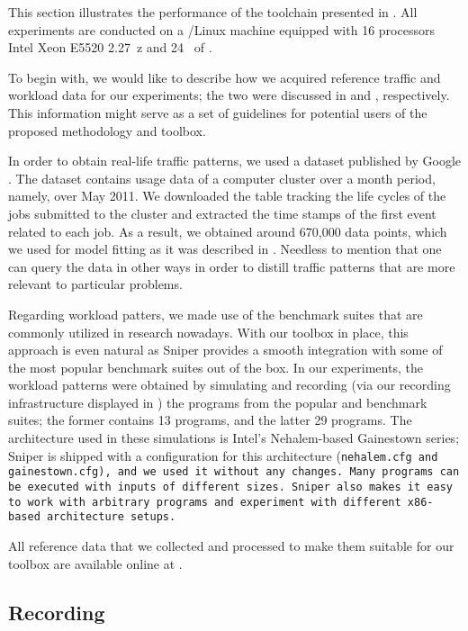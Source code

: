 This section illustrates the performance of the toolchain presented in
. All experiments are conducted on a /Linux machine
equipped with 16 processors Intel Xeon E5520 2.27~z and 24~ of
.

To begin with, we would like to describe how we acquired reference traffic and
workload data for our experiments; the two were discussed in  and
, respectively. This information might serve as a set of
guidelines for potential users of the proposed methodology and toolbox.

In order to obtain real-life traffic patterns, we used a dataset published by
Google \cite{google}. The dataset contains usage data of a computer cluster over
a month period, namely, over May 2011. We downloaded the table tracking the life
cycles of the jobs submitted to the cluster and extracted the time stamps of the
first event related to each job. As a result, we obtained around 670,000 data
points, which we used for model fitting as it was described in .
Needless to mention that one can query the data in other ways in order to
distill traffic patterns that are more relevant to particular problems.

Regarding workload patters, we made use of the benchmark suites that are
commonly utilized in research nowadays. With our toolbox in place, this approach
is even natural as Sniper provides a smooth integration with some of the most
popular benchmark suites out of the box. In our experiments, the workload
patterns were obtained by simulating and recording (via our recording
infrastructure displayed in ) the programs from the popular
 \cite{bienia2011} and  \cite{cpu2006} benchmark
suites; the former contains 13 programs, and the latter 29 programs. The
architecture used in these simulations is Intel's Nehalem-based Gainestown
series; Sniper is shipped with a configuration for this architecture
(\tt{nehalem.cfg} and \tt{gainestown.cfg}), and we used it without any changes.
Many programs can be executed with inputs of different sizes. Sniper also makes
it easy to work with arbitrary programs and experiment with different x86-based
architecture setups.

All reference data that we collected and processed to make them suitable for our
toolbox are available online at \cite{sources}.

\subsection{Recording}


